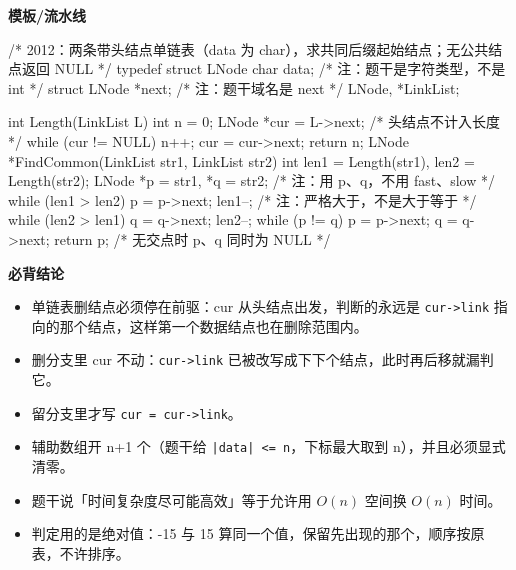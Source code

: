 \documentclass[10pt,a4paper]{ctexart}
\begin{document}
\textbf{模板/流水线}

\begin{codebox}
/* 2012：两条带头结点单链表（data 为 char），求共同后缀起始结点；无公共结点返回 NULL */
typedef struct LNode {
    char data;                             /* 注：题干是字符类型，不是 int */
    struct LNode *next;                    /* 注：题干域名是 next */
} LNode, *LinkList;

int Length(LinkList L) {
    int n = 0;
    LNode *cur = L->next;                  /* 头结点不计入长度 */
    while (cur != NULL) { n++; cur = cur->next; }
    return n;
}
LNode *FindCommon(LinkList str1, LinkList str2) {
    int len1 = Length(str1), len2 = Length(str2);
    LNode *p = str1, *q = str2;            /* 注：用 p、q，不用 fast、slow */
    while (len1 > len2) { p = p->next; len1--; }   /* 注：严格大于，不是大于等于 */
    while (len2 > len1) { q = q->next; len2--; }
    while (p != q) { p = p->next; q = q->next; }
    return p;                              /* 无交点时 p、q 同时为 NULL */
}
\end{codebox}





\textbf{必背结论}

\begin{itemize}

\item 单链表删结点必须停在前驱：cur 从头结点出发，判断的永远是 \texttt{cur->link} 指向的那个结点，这样第一个数据结点也在删除范围内。

\item 删分支里 cur 不动：\texttt{cur->link} 已被改写成下下个结点，此时再后移就漏判它。

\item 留分支里才写 \texttt{cur = cur->link}。

\item 辅助数组开 n+1 个（题干给 \texttt{|data| <= n}，下标最大取到 n），并且必须显式清零。

\item 题干说「时间复杂度尽可能高效」等于允许用 $O(n)$ 空间换 $O(n)$ 时间。

\item 判定用的是绝对值：-15 与 15 算同一个值，保留先出现的那个，顺序按原表，不许排序。

\end{itemize}
\end{document}
